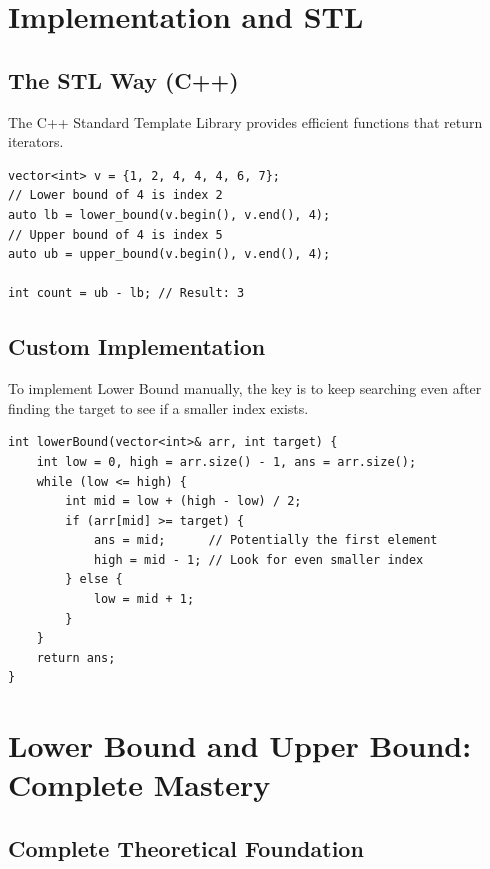 \documentclass[11pt,a4paper,oneside]{book}
\begin{document}
\section{Implementation and STL}

\subsection{The STL Way (C++)}
The C++ Standard Template Library provides efficient functions that return iterators.

\begin{tcolorbox}[enhanced, colback=darkgray!5!white, colframe=darkgray, title=C++ STL Example]
\begin{verbatim}
vector<int> v = {1, 2, 4, 4, 4, 6, 7};
// Lower bound of 4 is index 2
auto lb = lower_bound(v.begin(), v.end(), 4); 
// Upper bound of 4 is index 5
auto ub = upper_bound(v.begin(), v.end(), 4); 

int count = ub - lb; // Result: 3
\end{verbatim}
\end{tcolorbox}

\subsection{Custom Implementation}
To implement Lower Bound manually, the key is to keep searching even after finding the target to see if a smaller index exists.



\begin{tcolorbox}[enhanced, colback=darkgray!5!white, colframe=darkgray, title=Manual Lower Bound]
\begin{verbatim}
int lowerBound(vector<int>& arr, int target) {
    int low = 0, high = arr.size() - 1, ans = arr.size();
    while (low <= high) {
        int mid = low + (high - low) / 2;
        if (arr[mid] >= target) {
            ans = mid;      // Potentially the first element
            high = mid - 1; // Look for even smaller index
        } else {
            low = mid + 1;
        }
    }
    return ans;
}
\end{verbatim}
\end{tcolorbox}

\section{Lower Bound and Upper Bound: Complete Mastery}

\subsection{Complete Theoretical Foundation}
\end{document}
